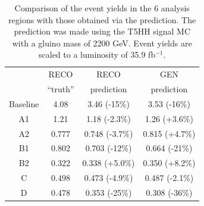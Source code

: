 \begin{table}
\centering
\caption[Predicted yields in the 6 signal bins using reinterpretation prescription.]{
Comparison of the event yields in the 6 analysis regions with those obtained via the prediction. The prediction was made using the T5HH signal MC with a gluino mass of 2200 GeV. Event yields are scaled to a luminosity of 35.9 fb$^{-1}$.
}
\begin{tabular}{c | c c c}
\hline\hline
         & RECO & RECO           & GEN\\
         & ``truth''             & prediction     & prediction\\
\hline
Baseline & 4.08     & 3.46 (-15\%)   & 3.53 (-16\%)\\
A1       & 1.21     & 1.18 (-2.3\%)  & 1.26 (+3.6\%)\\
A2       & 0.777    & 0.748 (-3.7\%) & 0.815 (+4.7\%)\\
B1       & 0.802    & 0.703 (-12\%)  & 0.664 (-21\%)\\
B2       & 0.322    & 0.338 (+5.0\%) & 0.350 (+8.2\%)\\
C        & 0.498    & 0.473 (-4.9\%) & 0.487 (-2.1\%)\\
D        & 0.478    & 0.353 (-25\%)   & 0.308 (-36\%)\\
\hline\hline
\end{tabular}
\label{tab:predclos}
\end{table}

%
